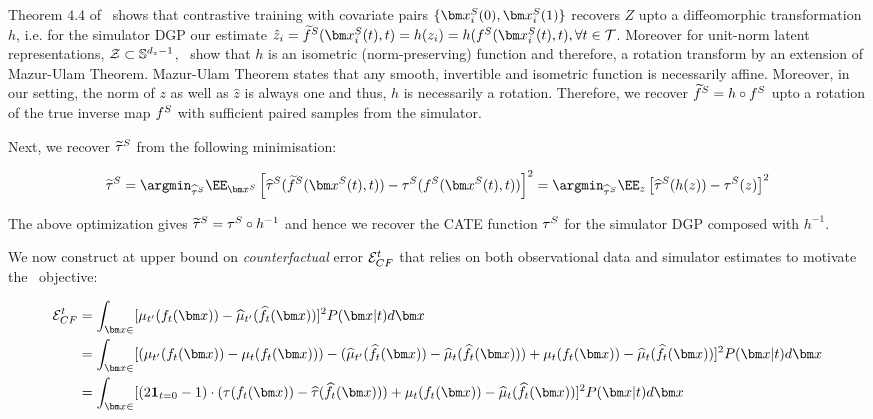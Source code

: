 {Theorem 4.4 of~\citep{von2021self} shows that contrastive training with covariate pairs $\{\xb_i^S(0), \xb_i^S(1)\}$ recovers $Z$ upto a diffeomorphic transformation $h$, i.e. for the simulator DGP our estimate $\hat{z}_i = \SInvTilde(\xb^S_i(t), t) = h(z_i) = h(\SInv(\xb^S_i(t), t), \forall t \in \Tspace$. Moreover for unit-norm latent representations, $\mathcal{Z} \subset \mathbb{S}^{d_z - 1}$,~\citep{zimmermann2021cl} show that $h$ is an isometric (norm-preserving) function and therefore, a rotation transform by an extension of Mazur-Ulam Theorem.  Mazur-Ulam Theorem states that any smooth, invertible and isometric function is necessarily affine. Moreover, in our setting, the norm of $z$ as well as $\hat{z}$ is always one and thus, $h$ is necessarily a rotation. Therefore, we recover $\widetilde{f}^S = h \circ f^S$ upto a rotation of the true inverse map $f^S$ with sufficient paired samples from the simulator.

Next, we recover $\widetilde{\tau}^S$ from the following minimisation:

\begin{align*}
    \syntauTilde %
    = \argmin_{\syntauhat} \EE_{\xb^S} \left[ \syntauhat(\SInvTilde(\xb^S(t), t)) - \syntau(\SInv(\xb^S(t), t))\right]^2
    = \argmin_{\syntauhat} \EE_{z} \left[ \syntauhat(h(z)) - \syntau(z)\right]^2
\end{align*}

The above optimization gives $\widetilde{\tau}^S = \tau^S \circ h^{-1}$ and hence we recover the CATE function $\tau^S$ for the simulator DGP composed with $h^{-1}$.
} 


\label{app:lemma:simponetbound}



 We now construct at upper bound on \textit{counterfactual} error $\mathcal{E}_{CF}^t$ that relies on both observational data and simulator estimates to motivate the \our\ objective:

\begin{align*}
    \ErrCF^t &= 
    \int_{\xb \in \xspace}[\realmu_{t'}(\RInv_t(\xb)) - \realmuhat_{t'}(\RInvhat_t(\xb))]^2 P(\xb|t)d\xb\\
    &= \int_{\xb \in \xspace}[(\realmu_{t'}(\RInv_t(\xb)) - \realmu_{t}(\RInv_t(\xb)) )- (\realmuhat_{t'}(\RInvhat_t(\xb)) - \realmuhat_{t}(\RInvhat_t(\xb)))
    + \realmu_{t}(\RInv_t(\xb))
    - \realmuhat_{t}(\RInvhat_t(\xb))]^2 P(\xb|t)d\xb\\
    &= \int_{\xb \in \xspace}[(2\mathbf{1}_{t=0} - 1)\cdot(\tau(\RInv_t(\xb))- \tauhat(\RInvhat_t(\xb)))
    + \realmu_{t}(\RInv_t(\xb))
    - \realmuhat_{t}(\RInvhat_t(\xb))]^2 P(\xb|t)d\xb\\
\end{align*}

